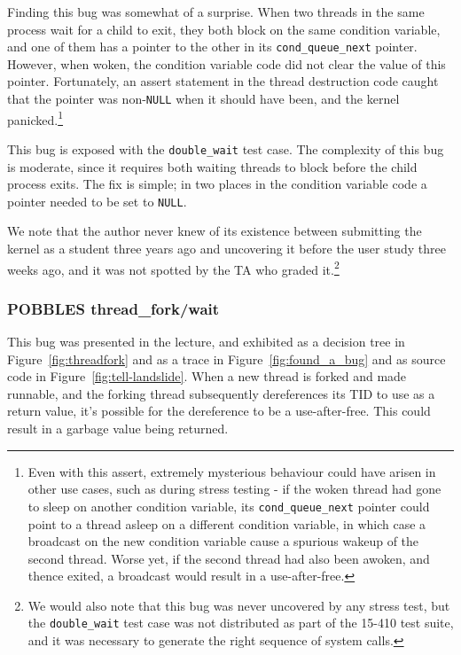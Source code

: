 Finding this bug was somewhat of a surprise. When two threads in the same process wait for a child to exit, they both block on the same condition variable, and one of them has a pointer to the other in its \texttt{cond\_queue\_next} pointer. However, when woken, the condition variable code did not clear the value of this pointer. Fortunately, an assert statement in the thread destruction code caught that the pointer was non-\texttt{NULL} when it should have been, and the kernel panicked.\footnote{
Even with this assert, extremely mysterious behaviour could have arisen in other use cases, such as during stress testing - if the woken thread had gone to sleep on another condition variable, its \texttt{cond\_queue\_next} pointer could point to a thread asleep on a different condition variable, in which case a broadcast on the new condition variable cause a spurious wakeup of the second thread. Worse yet, if the second thread had also been awoken, and thence exited, a broadcast would result in a use-after-free.}

This bug is exposed with the \texttt{double\_wait} test case.
The complexity of this bug is moderate, since it requires both waiting threads to block before the child process exits.
The fix is simple; in two places in the condition variable code a pointer needed to be set to \texttt{NULL}.

We note that the author never knew of its existence between submitting the kernel as a student three years ago and uncovering it before the user study three weeks ago, and it was not spotted by the TA who graded it.\footnote{
We would also note that this bug was never uncovered by any stress test, but the \texttt{double\_wait} test case was not distributed as part of the 15-410 test suite, and it was necessary to generate the right sequence of system calls.}

\subsubsection{POBBLES thread\_fork/wait}
\label{sec:eval-thread-fork}

This bug was presented in the lecture, and exhibited as a decision tree in Figure~\ref{fig:threadfork} and as a trace in Figure~\ref{fig:found_a_bug} and as source code in Figure~\ref{fig:tell-landslide}. When a new thread is forked and made runnable, and the forking thread subsequently dereferences its TID to use as a return value, it's possible for the dereference to be a use-after-free. This could result in a garbage value being returned.

